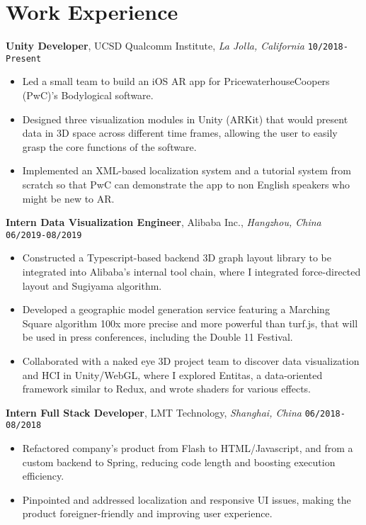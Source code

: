 \documentclass[10pt, letterpaper]{article}
\begin{document}
	\section{Work Experience}
	\smallskip
	\textbf{\large Unity Developer}, UCSD Qualcomm Institute, \textit{La Jolla, California} \hfill \texttt{10/2018-Present}
	\begin{itemize}
		\item Led a small team to build an iOS AR app for PricewaterhouseCoopers (PwC)'s Bodylogical software.

		\item Designed three visualization modules in Unity (ARKit) that would present data in 3D space across different time frames, allowing the user to easily grasp the core functions of the software.

		\item Implemented an XML-based localization system and a tutorial system from scratch so that PwC can demonstrate the app to non English speakers who might be new to AR.

	\end{itemize}
	\textbf{\large Intern Data Visualization Engineer}, Alibaba Inc., \textit{Hangzhou, China} \hfill \texttt{06/2019-08/2019}
	\begin{itemize}
		\item Constructed a Typescript-based backend 3D graph layout library to be integrated into Alibaba's internal tool chain, where I integrated force-directed layout and Sugiyama algorithm.

		\item Developed a geographic model generation service featuring a Marching Square algorithm 100x more precise and more powerful than turf.js, that will be used in press conferences, including the Double 11 Festival.

		\item Collaborated with a naked eye 3D project team to discover data visualization and HCI in Unity/WebGL, where I explored Entitas, a data-oriented framework similar to Redux, and wrote shaders for various effects.

	\end{itemize}
	\textbf{\large Intern Full Stack Developer}, LMT Technology, \textit{Shanghai, China} \hfill \texttt{06/2018-08/2018}
	\begin{itemize}
		\item Refactored company's product from Flash to HTML/Javascript, and from a custom backend to Spring, reducing code length and boosting execution efficiency.

		\item Pinpointed and addressed localization and responsive UI issues, making the product foreigner-friendly and improving user experience.

	\end{itemize}
\end{document}
